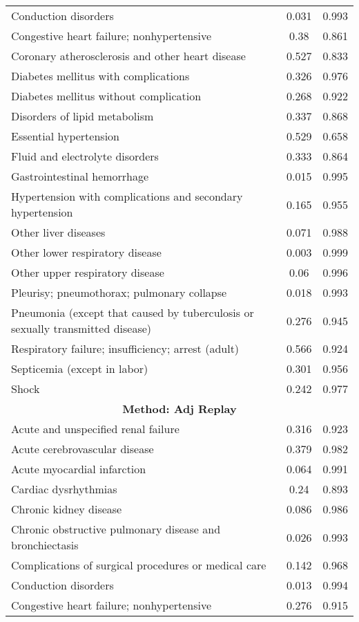 \documentclass{article}
\begin{document}
\begin{longtable}{lcc}
Conduction disorders & 0.031 & 0.993 \\
Congestive heart failure; nonhypertensive & 0.38 & 0.861 \\
Coronary atherosclerosis and other heart disease & 0.527 & 0.833 \\
Diabetes mellitus with complications & 0.326 & 0.976 \\
Diabetes mellitus without complication & 0.268 & 0.922 \\
Disorders of lipid metabolism & 0.337 & 0.868 \\
Essential hypertension & 0.529 & 0.658 \\
Fluid and electrolyte disorders & 0.333 & 0.864 \\
Gastrointestinal hemorrhage & 0.015 & 0.995 \\
Hypertension with complications and secondary hypertension & 0.165 & 0.955 \\
Other liver diseases & 0.071 & 0.988 \\
Other lower respiratory disease & 0.003 & 0.999 \\
Other upper respiratory disease & 0.06 & 0.996 \\
Pleurisy; pneumothorax; pulmonary collapse & 0.018 & 0.993 \\
Pneumonia (except that caused by tuberculosis or sexually transmitted disease) & 0.276 & 0.945 \\
Respiratory failure; insufficiency; arrest (adult) & 0.566 & 0.924 \\
Septicemia (except in labor) & 0.301 & 0.956 \\
Shock & 0.242 & 0.977 \\
\midrule
\multicolumn{3}{c}{\textbf{Method: Adj Replay}} \\
\midrule
Acute and unspecified renal failure & 0.316 & 0.923 \\
Acute cerebrovascular disease & 0.379 & 0.982 \\
Acute myocardial infarction & 0.064 & 0.991 \\
Cardiac dysrhythmias & 0.24 & 0.893 \\
Chronic kidney disease & 0.086 & 0.986 \\
Chronic obstructive pulmonary disease and bronchiectasis & 0.026 & 0.993 \\
Complications of surgical procedures or medical care & 0.142 & 0.968 \\
Conduction disorders & 0.013 & 0.994 \\
Congestive heart failure; nonhypertensive & 0.276 & 0.915 \\

\end{longtable}
\end{document}

